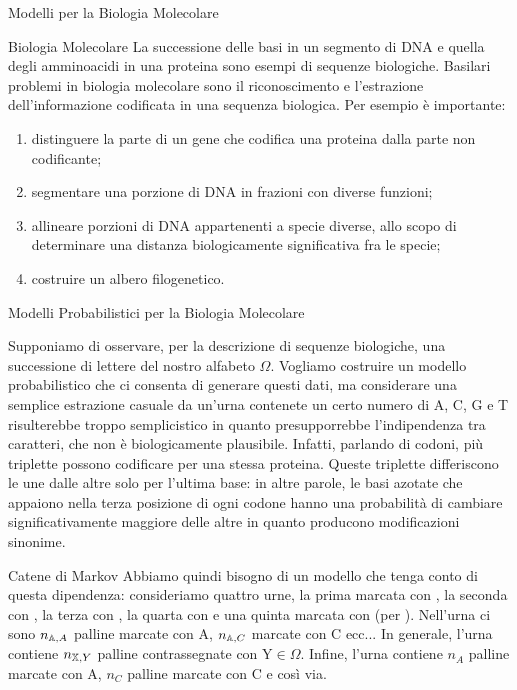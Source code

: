 \documentclass{article}
\begin{document}
\begin{section}{Modelli per la Biologia Molecolare}
\begin{subsection}{Biologia Molecolare}
			La successione delle basi in un segmento di DNA e quella degli amminoacidi in una proteina sono esempi di sequenze biologiche. Basilari problemi in biologia molecolare sono il riconoscimento e l’estrazione dell’informazione codificata in una sequenza biologica. Per esempio è importante:
			\begin{enumerate}[1)]
				\item distinguere la parte di un gene che codifica una proteina dalla parte non codificante;
				\item segmentare una porzione di DNA in frazioni con diverse funzioni;
				\item allineare porzioni di DNA appartenenti a specie diverse, allo scopo di determinare una distanza biologicamente significativa fra le specie;
				\item costruire un albero filogenetico.
			\end{enumerate}
		\end{subsection}
		\begin{subsection}{Modelli Probabilistici per la Biologia Molecolare}
			
			Supponiamo di osservare, per la descrizione di sequenze biologiche, una successione di lettere del nostro alfabeto $\Omega$.
			Vogliamo costruire un modello probabilistico che ci consenta di generare questi dati, ma considerare una semplice estrazione casuale da un’urna contenete un certo numero di A, C, G e T risulterebbe troppo semplicistico in quanto presupporrebbe l’indipendenza tra caratteri, che non è biologicamente plausibile. Infatti, parlando di codoni, più triplette possono codificare per una stessa proteina. Queste triplette differiscono le une dalle altre solo per l’ultima base: in altre parole, le basi azotate che appaiono nella terza posizione di ogni codone hanno una probabilità di cambiare significativamente maggiore delle altre in quanto producono modificazioni sinonime.
			
			\begin{subsubsection}{Catene di Markov}
				Abbiamo quindi bisogno di un modello che tenga conto di questa dipendenza: consideriamo quattro urne, la prima marcata con , la seconda con , la terza con , la quarta con  e una quinta marcata con  (per ).
				Nell’urna \urna{A} ci sono $n_{,A}$ palline marcate con A, $n_{\mathbb{A},C}$ marcate con C ecc... 
				In generale, l’urna \urna{X} contiene $n_{,Y}$ palline contrassegnate con Y$\in \Omega$.
				Infine, l’urna  contiene $n_A$ palline marcate con A, $n_C$ palline marcate con C e così via.
				

\end{subsubsection}
\end{subsection}
\end{section}
\end{document}
